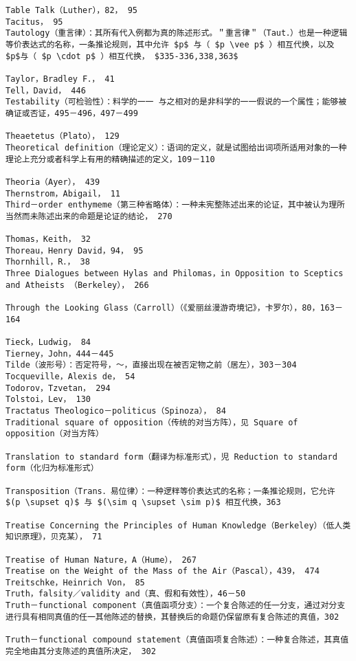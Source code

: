 \begin{verbatim}
Table Talk（Luther），82， 95
Tacitus， 95
Tautology（重言律）：其所有代入例都为真的陈述形式。＂重言律＂（Taut．）也是一种逻辑等价表达式的名称，一条推论规则，其中允许 $p$ 与（ $p \vee p$ ）相互代换，以及 $p$与（ $p \cdot p$ ）相互代换， $335-336,338,363$

Taylor，Bradley F．， 41
Tell，David， 446
Testability（可检验性）：料学的一一 与之相对的是非科学的一一假说的一个属性；能够被确证或否证，495－496，497－499

Theaetetus（Plato）， 129
Theoretical definition（理论定义）：语词的定义，就是试图给出词项所适用对象的一种理论上充分或者科学上有用的精确描述的定义，109－110

Theoria（Ayer）， 439
Thernstrom，Abigail， 11
Third－order enthymeme（第三种省略体）：一种未宪整陈述出来的论证，其中被认为理所当然而未陈述出来的命题是论证的结论， 270

Thomas，Keith， 32
Thoreau，Henry David，94， 95
Thornhill，R．， 38
Three Dialogues between Hylas and Philomas，in Opposition to Sceptics and Atheists （Berkeley）， 266

Through the Looking Glass（Carroll）（《爱丽丝漫游奇境记》，卡罗尔），80，163－164

Tieck，Ludwig， 84
Tierney，John，444－445
Tilde（波形号）：否定符号，～，直接出现在被否定物之前（居左），303－304
Tocqueville，Alexis de， 54
Todorov，Tzvetan， 294
Tolstoi，Lev， 130
Tractatus Theologico－politicus（Spinoza）， 84
Traditional square of opposition（传统的对当方阵），见 Square of opposition（对当方阵）

Translation to standard form（翻译为标准形式），児 Reduction to standard form（化归为标准形式）

Transposition（Trans．易位律）：一种逻䉽等价表达式的名称；一条推论规则，它允许 $(p \supset q)$ 与 $(\sim q \supset \sim p)$ 相互代换，363

Treatise Concerning the Principles of Human Knowledge（Berkeley）（低人类知识原理》，贝克某）， 71

Treatise of Human Nature，A（Hume）， 267
Treatise on the Weight of the Mass of the Air（Pascal），439， 474
Treitschke，Heinrich Von， 85
Truth，falsity／validity and（真、假和有效性），46－50
Truth－functional component（真值函项分支）：一个复合陈述的任一分支，通过对分支进行具有相同真值的任一其他陈述的替换，其替换后的命题仍保留原有复合陈述的真值，302

Truth－functional compound statement（真值函项复合陈述）：一种复合陈述，其真值完全地由其分支陈述的真值所决定， 302


\end{verbatim}
